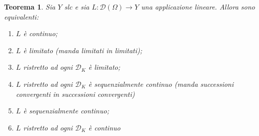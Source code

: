 \documentclass[italian,a4paper,oneside,headinclude]{scrbook}
\newcommand{\D}{\mathcal D}
\newtheorem{theorem}{Teorema}
\begin{document}
\begin{theorem}\label{th:slc_cont}
  Sia $Y$ slc e sia $L\colon \D(\Omega)\to Y$ una applicazione
  lineare. Allora sono equivalenti:
  \begin{enumerate}
  \item
    $L$ è continuo;
  \item
    $L$ è limitato (manda limitati in limitati);
  \item
    $L$ ristretto ad ogni $\D_K$ è limitato;
  \item
    $L$ ristretto ad ogni $\D_K$ è sequenzialmente continuo (manda
    successioni convergenti in successioni convergenti)
  \item
    $L$ è sequenzialmente continuo;
  \item
    $L$ ristretto ad ogni $\D_K$ è continuo
  \end{enumerate}
\end{theorem}
%
\end{document}

